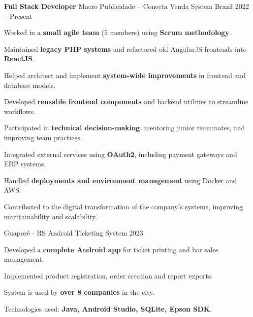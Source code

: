\documentclass[11pt, a4paper]{russell}
\begin{document}
    \begin{cventries}
        \cventry
        {\textbf{Full Stack Developer}}
        {Macro Publicidade -- Conecta Venda System}
        {Brazil}
        {2022 -- Present}
        {
            \begin{cvitems}
                \item {Worked in a \textbf{small agile team} (5 members) using \textbf{Scrum methodology}.}
                \item {Maintained \textbf{legacy PHP systems} and refactored old AngularJS frontends into \textbf{ReactJS}.}
                \item {Helped architect and implement \textbf{system-wide improvements} in frontend and database models.}
                \item {Developed \textbf{reusable frontend components} and backend utilities to streamline workflows.}
                \item {Participated in \textbf{technical decision-making}, mentoring junior teammates, and improving team practices.}
                \item {Integrated external services using \textbf{OAuth2}, including payment gateways and ERP systems.}
                \item {Handled \textbf{deployments and environment management} using Docker and AWS.}
                \item {Contributed to the digital transformation of the company's systems, improving maintainability and scalability.}
            \end{cvitems}
        }
    \end{cventries}




    \begin{cventries}
        \cventry
        {Guaporé - RS}
        {Android Ticketing System}
        {2023}
        {}
        {
            \begin{cvitems}
                \item {Developed a \textbf{complete Android app} for ticket printing and bar sales management.}
                \item {Implemented product registration, order creation and report exports.}
                \item {System is used by \textbf{over 8 companies} in the city.}
                \item {Technologies used: \textbf{Java, Android Studio, SQLite, Epson SDK}.}
            \end{cvitems}
        }
    \end{cventries}
\end{document}
